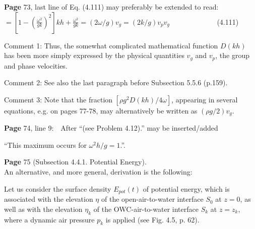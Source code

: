 \documentclass[a4paper,12pt]{article}
\begin{document}
\noindent %
{\bf Page} 73, last line of Eq. (4.111) may preferably be extended to read: \,\, 
 $= \left[1 - \left(\frac{\omega^{2}}{gk}\right)^{2}\right]kh + \frac{\omega^{2}}{gk} = (2\omega/g)v_g = (2k/g)v_p v_g$ \,\,\,\,\,\,\,\,\,\,\,\,\,\,\,\,\,\,\,\,\,\,\,\,\,\,\,\,\,\,\,\,\,\,\,\, (4.111) \vspace{0.2cm} %

\noindent
Comment 1: Thus, the somewhat complicated mathematical function $D(kh)$ has been more simply expressed by the physical quantities  $v_g$ and $v_p$, the group and phase velocities. %
\vspace{0.1cm}

\noindent Comment 2: See also the last paragraph before Subsection 5.5.6 (p.159).%
\vspace{0.1cm}

\noindent Comment 3: Note that the fraction $[\rho g^2 D(kh)/4\omega]$, appearing in several equations, e.g. on pages 77-78, may alternatively be written as $(\rho g/2) v_g$.
\vspace{0.2cm}   %

\noindent %
{\bf Page} 74, line 9: \,\, After ``(see Problem 4.12).'' may be inserted/added 

``This maximum occurs for $\omega^2h/g = 1$.''. %
\vspace{0.2cm}

\noindent %
{\bf Page} 75 (Subsection 4.4.1. Potential Energy).\\ An alternative, and more general, derivation is the following:
\vspace{0.2cm}

Let us consider the surface density $E_{{pot}}(t)$ of potential energy, which is associated with the elevation $\eta$ of the open-air-to-water interface $S_0$ at $z=0$, as well as with the elevation $\eta_k$ of the OWC-air-to-water interface $S_k$ at $z=z_k$, where a dynamic air pressure $p_k$ is applied (see Fig. 4.5, p. 62). 
\end{document}
